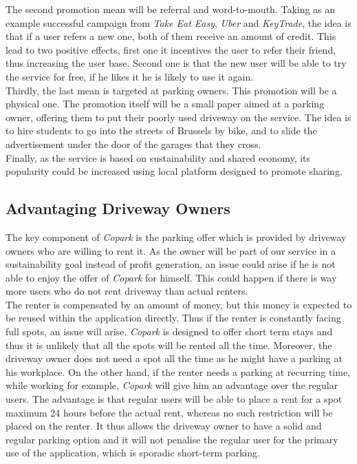 \documentclass[12pt,a4paper,oneside]{book}
\newcommand{\bp}{\textit{Copark}}
\begin{document}
The second promotion mean will be referral and word-to-mouth. Taking as an example successful campaign from \textit{Take Eat Easy}, \textit{Uber} and \textit{KeyTrade}, the idea is that if a user refers a new one, both of them receive an amount of credit. This lead to two positive effects, first one it incentives the user to refer their friend, thus increasing the user base. Second one is that the new user will be able to try the service for free, if he likes it he is likely to use it again.\\

Thirdly, the last mean is targeted at parking owners. This promotion will be a physical one. The promotion itself will be a small paper aimed at a parking owner, offering them to put their poorly used driveway on the service. The idea is to hire students to go into the streets of Brussels by bike, and to slide the advertisement under the door of the garages that they cross.\\

Finally, as the service is based on sustainability and shared economy, its popularity could be increased using local platform designed to promote sharing.\\

\subsection{Advantaging Driveway Owners}
\label{advdo}
The key component of \bp{} is the parking offer which is provided by driveway owners who are willing to rent it. As the owner will be part of our service in a sustainability goal instead of profit generation, an issue could arise if he is not able to enjoy the offer of \bp{} for himself. This could happen if there is way more users who do not rent driveway than actual renters.\\

The renter is compensated by an amount of money, but this money is expected to be reused within the application directly. Thus if the renter is constantly facing full spots, an issue will arise. \bp{} is designed to offer short term stays and thus it is unlikely that all the spots will be rented all the time. Moreover, the driveway owner does not need a spot all the time as he might have a parking at his workplace. On the other hand, if the renter needs a parking at recurring time, while working for example, \bp{} will give him an advantage over the regular users. The advantage is that regular users will be able to place a rent for a spot maximum 24 hours before the actual rent, whereas no such restriction will be placed on the renter. It thus allows the driveway owner to have a solid and regular parking option and it will not penalise the regular user for the primary use of the application, which is sporadic short-term parking.\\
\end{document}
